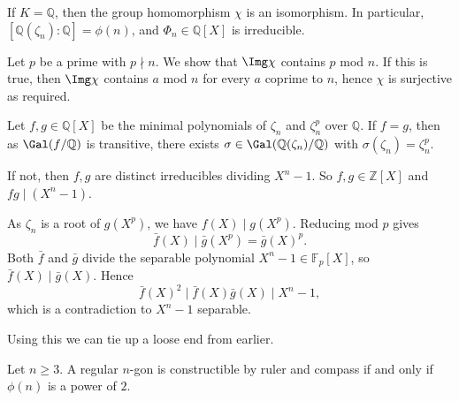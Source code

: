 \documentclass[12pt]{article}
\begin{document}
\begin{theorem}
	If $K = \mathbb{Q}$, then the group homomorphism $\chi$ is an isomorphism. In particular, $[\mathbb{Q}(\zeta_n) : \mathbb{Q}] = \phi(n)$, and $\Phi_n \in \mathbb{Q}[X]$ is irreducible.
\end{theorem}

\begin{proofbox}
	Let $p$ be a prime with $p \nmid n$. We show that $\Img \chi$ contains $p$ mod $n$. If this is true, then $\Img \chi$ contains $a$ mod $n$ for every $a$ coprime to $n$, hence $\chi$ is surjective as required.

	Let $f, g \in \mathbb{Q}[X]$ be the minimal polynomials of $\zeta_n$ and $\zeta_n^p$ over $\mathbb{Q}$. If $f = g$, then as $\Gal(f/\mathbb{Q})$ is transitive, there exists $\sigma \in \Gal(\mathbb{Q}(\zeta_n)/\mathbb{Q})$ with $\sigma(\zeta_n) = \zeta_n^p$.

	If not, then $f, g$ are distinct irreducibles dividing $X^n - 1$. So $f, g \in \mathbb{Z}[X]$ and $fg \mid (X^n - 1)$.

	As $\zeta_n$ is a root of $g(X^p)$, we have $f(X) \mid g(X^p)$. Reducing mod $p$ gives
	\[
	\bar f(X) \mid \bar g(X^p) = \bar g(X)^p.
	\]
	Both $\bar f$ and $\bar g$ divide the separable polynomial $X^n - 1 \in \mathbb{F}_p[X]$, so $\bar f(X) \mid \bar g(X)$. Hence
	\[
	\bar f(X)^2 \mid \bar f(X) \bar g(X) \mid X^n - 1,
	\]
	which is a contradiction to $X^n - 1$ separable.
\end{proofbox}

Using this we can tie up a loose end from earlier.

\begin{theorem}
	Let $n \ge 3$. A regular $n$-gon is constructible by ruler and compass if and only if $\phi(n)$ is a power of $2$.
\end{theorem}
\end{document}
